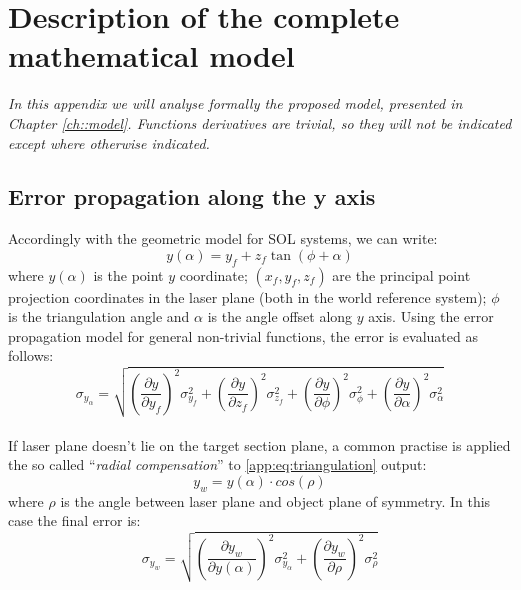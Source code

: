 \chapter{Description of the complete mathematical model}
\label{ap:model}
\textit{In this appendix we will analyse formally the proposed model, presented in Chapter \ref{ch::model}. Functions derivatives are trivial, so they will not be indicated except where otherwise indicated.}

\section*{Error propagation along the y axis}
Accordingly with the geometric model for \acs{SOL} systems, we can write:
  \begin{equation}
    \label{app:eq:triangulation}
	y(\alpha) = y_f + z_f \tan(\phi + \alpha)
  \end{equation}
where $y(\alpha)$ is the point $y$ coordinate; $(x_f, y_f, z_f)$ are the principal point projection coordinates in the laser plane (both in the world reference system); $\phi$ is the triangulation angle and $\alpha$ is the angle offset along $y$ axis.
Using the error propagation model for general non-trivial functions, the error is evaluated as follows:
  \begin{equation*}
    \sigma_{y_\alpha} = \sqrt{
      \left( \frac{\partial y}{\partial y_f} \right)^2 \sigma_{y_f}^2
      + \left( \frac{\partial y}{\partial z_f} \right)^2 \sigma_{z_f}^2
      + \left( \frac{\partial y}{\partial \phi} \right)^2 \sigma_\phi^2
      + \left( \frac{\partial y}{\partial \alpha} \right)^2 \sigma_\alpha^2
    }
  \end{equation*} \\

If laser plane doesn't lie on the target section plane, a common practise is applied the so called ``\textit{radial compensation}'' to \ref{app:eq:triangulation} output:
  \begin{equation*}
    y_w = y(\alpha) \cdot cos(\rho)
  \end{equation*}
where $\rho$ is the angle between laser plane and object plane of symmetry.
In this case the final error is:
  \begin{equation}
    \sigma_{y_w} = \sqrt{
      \left( \frac{\partial y_w}{\partial y(\alpha)} \right)^2 \sigma_{y_\alpha}^2
      + \left( \frac{\partial y_w}{\partial \rho} \right)^2 \sigma_\rho^2
    }
    \label{app:eq:sigma-yw}
  \end{equation} \\


